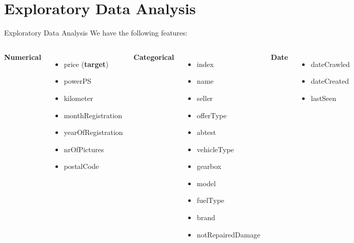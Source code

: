 \documentclass{beamer}
\begin{document}
\section{Exploratory Data Analysis}
\begin{frame}{Exploratory Data Analysis}
\scriptsize %
We have the following features:
\vspace{0.5em}

\begin{columns}[t] %
    \textbf{Numerical} \\
    \begin{itemize}
            \item price (\textbf{target})
        \item powerPS
        \item kilometer
        \item monthRegistration
        \item yearOfRegistration
        \item nrOfPictures
        \item postalCode
    \end{itemize}

    \textbf{Categorical} \\
    \begin{itemize}
        \item index
        \item name
        \item seller
        \item offerType
        \item abtest
        \item vehicleType
        \item gearbox
        \item model
        \item fuelType
        \item brand
        \item notRepairedDamage
    \end{itemize}

    \textbf{Date} \\
    \begin{itemize}
        \item dateCrawled
        \item dateCreated
        \item lastSeen
    \end{itemize}
\end{columns}
\end{frame}
\end{document}
